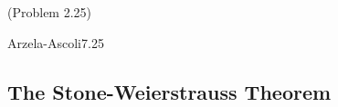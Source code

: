 \begin{nlemma}{ (Problem 2.25)}{}
    
\end{nlemma}

\begin{nproof}

\end{nproof}

\setcounter{rudin}{24}
\begin{theorem}{Arzela-Ascoli}{7.25}
    
\end{theorem}

\begin{nproof}
    
\end{nproof}

\subsection{The Stone-Weierstrauss Theorem}

